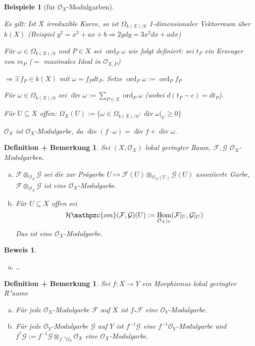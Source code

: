 \documentclass[paper = A4, fontsize=12pt, numbers=noendperiod, chapterprefix=true]{scrbook}
\theoremstyle{break}
\newtheorem{DefBem}[Def]{Definition + Bemerkung}
\theoremstyle{nonumberbreak}
\newtheorem{bspe}{Beispiele}
\newtheorem{bew}{Beweis}
\theoremstyle{nonumberplain}
\DeclareMathOperator{\Hom}{Hom}
\DeclareMathOperator{\ddiv}{div}
\DeclareMathOperator{\ord}{ord}
\newcommand{\calF}{\mathcal{F}}
\newcommand{\calG}{\mathcal{G}}
\newcommand{\calO}{\mathcal{O}}
\newcommand{\calHom}{\mathcal{H}\mathpzc{om}}
\begin{document}
\begin{bspe}[f\"ur $\calO_X$-Modulgarben]
\begin{enumerate}[1)]
	\emph{Es gilt}: Ist $X$ irreduzible Kurve, so ist $\Omega_{k(X)/k}$ 1-dimensionaler Vektorraum \"uber $k(X)$ (Beispiel $y^2 = x^3 + ax + b \Rightarrow 2ydy = 3x^2dx + adx$)
	
	F\"ur $\omega \in \Omega_{k(X)/k}$ und $P \in X$ sei $\ord_P \omega$ wie folgt definiert: sei $t_P$ ein Erzeuger von $m_P$ ($=$ maximales Ideal in $\calO_{X,P}$)
	
	$\Rightarrow \exists\ f_P \in k(X)$ mit $\omega = f_P dt_P$. Setze $\ord_P \omega := \ord_P f_P$
	
	F\"ur $\omega \in \Omega_{k(X)/k}$ sei $\ddiv \omega := \sum\limits_{P \in X} \ord_P \omega$ (wobei $d(t_P - c) = dt_P$).
	
	F\"ur $U \subseteq X$ offen: $\Omega_X(U) := \{ \omega \in \Omega_{k(X)/k}: \ddiv \omega|_U \ge 0\}$
	
	$\calO_X$ ist $\calO_X$-Modulgarbe, da $\ddiv(f \cdot \omega) = \ddiv f + \ddiv \omega$.
\end{enumerate}\end{bspe}

\begin{DefBem}
Sei $(X, \calO_X)$ lokal geringter Raum, $\calF, \calG$ $\calO_X$-Modulgarben.
\begin{enumerate}[a)]
\item
	$\calF \otimes_{\calO_X} \calG$ sei die zur Pr\"agarbe $U \mapsto \calF(U) \otimes_{\calO_X(U)} \calG(U)$ assoziierte Garbe, $\calF \otimes_{\calO_X} \calG$ ist eine $\calO_X$-Modulgarbe.
\item
	F\"ur $U \subseteq X$ offen sei
		\[ \calHom(\calF, \calG)(U) := \Hom_{\calO_X|_U} (\calF|_U, \calG|_U) \]
	Das ist eine $\calO_X$-Modulgarbe.
\end{enumerate}\end{DefBem}

\begin{bew}\begin{enumerate}[a)]\item[b)]
\ldots
\end{enumerate}\end{bew}

\begin{DefBem}\label{9.3}
Sei $f: X \to Y$ ein Morphismus lokal geringter R"aume
\begin{enumerate}[a)]
\item\label{9.3a}
	F\"ur jede $\calO_X$-Modulgarbe $\calF$ auf $X$ ist $f_* \calF$ eine $\calO_Y$-Modulgarbe.
\item
	F\"ur jede $\calO_Y$-Modulgarbe $\calG$ auf $Y$ ist $f^{-1} \calG$ eine $f^{-1} \calO_Y$-Modulgarbe und $f^* \calG := f^{-1} \calG \otimes_{f^{-1}\calO_Y} \calO_X$ eine $\calO_X$-Modulgarbe.
\end{enumerate}\end{DefBem}
\end{document}
